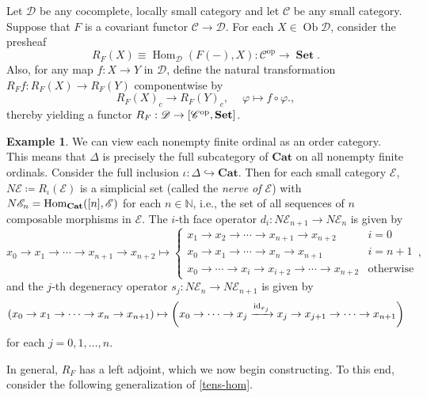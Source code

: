 \documentclass[10pt,letterpaper,cm]{nupset}
\theoremstyle{definition}
\newtheorem{exmp}[definition]{Example}
\theoremstyle{theorem}
\theoremstyle{remark}
\DeclareMathOperator{\ob}{Ob}
\newcommand{\0}{\mathbf{0}}
\newcommand{\1}{\mathbf{1}}
\newcommand{\2}{\mathbf{2}}
\DeclareMathOperator{\op}{op}
\DeclareMathOperator{\set}{\mathbf{Set}}
\renewcommand{\c}{\mathscr{C}}
\renewcommand{\d}{\mathscr{D}}
\newcommand{\e}{\mathscr{E}}
\newcommand{\N}{\mathbb N}
\DeclareMathOperator{\Hom}{Hom}
\DeclareMathOperator{\idd}{id}
\begin{document}
Let $\d$ be any cocomplete, locally small category and let $\c$ be any small category. Suppose that $F$ is a covariant functor $ \c \to \d$. For each $X \in \ob{\d}$, consider the presheaf $$R_F(X)\equiv \Hom_{\d}(F({-}), X) : \c^{\op} \to \set.$$ Also, for any map $f : X\to Y$ in $\d$, define the natural transformation $R_F{f} : R_F(X)  \to R_F(Y)$ componentwise by
\[
R_F(X)_c \to R_F(Y)_c,\ \quad \varphi \mapsto f \circ \varphi.
,\] thereby yielding a functor $R_F: \d \to \mleft[\c^{\op}, \set\mright]$. 

\begin{exmp}\label{nerve}
We can view each nonempty finite ordinal  as an order category. This means that $\varDelta$ is precisely the full subcategory of $\mathbf{Cat}$ on all nonempty finite ordinals. Consider the full inclusion $\iota : \varDelta \hookrightarrow \mathbf{Cat}$. Then for each small category $\e$, $N{\e} \coloneqq R_{\iota}(\e)$ is a simplicial set (called the \textit{nerve of $\e$}) with $N{\e}_n = \Hom_{\mathbf{Cat}}(\mleft[n\mright], \e)$ for each $n\in \N$, i.e.,  the set of all sequences of $n$ composable morphisms in $\e$.
The $i$-th face operator $d_i : N{\e}_{n+1}\to N{\e}_n$ is given by
\[
{x_0 \to x_1 \to \cdots \to x_{n+1} \to x_{n+2}} \mapsto \begin{cases}
{x_1 \to x_2\to \cdots \to x_{n+1} \to x_{n+2}} & i=0
\\ {x_0 \to x_1 \to \cdots \to x_n\to x_{n+1}} & i= n+1
\\ {x_0  \to \cdots \to x_i \to x_{i+2} \to \cdots  \to x_{n+2}} & \text{otherwise}
\end{cases}
,\] 
and the $j$-th degeneracy operator $s_j : N{\e}_n \to N{\e}_{n+1}$ is given by
\[
\mleft( x_0 \to x_1 \to \cdots \to x_{n} \to x_{n+1}\mright) \mapsto  \mleft({x_0 \to \cdots \to x_j \xrightarrow{\idd_{x_j}} x_j \to x_{j+1} \to \cdots \to x_{n+1}}\mright)  
\] for each $j=0,1, \ldots, n$.
\end{exmp}

In general, $R_F$ has a left adjoint, which we now begin constructing. To this end, consider the following generalization of \cref{tens-hom}. 

\begin{comment}
For each $x\in \ob{\d}$ and $n\in \N$, let $$R{x_n}= \Hom_{\d}(F[n], x).$$ Define the face operator $d_i : R{x_{n+1}} \to R{x_n}$ and the degeneracy operator $s_i : R{x_n} \to R{x_{n+1}}$ as the set maps $\Hom_{\d}(F(\delta_i^n), x)$ and $\Hom_{\d}(F(\sigma_i^n), x)$, respectively. By functoriality of $F$, the $F(\delta_i^n)$ and $F(\sigma_i^n)$ satisfy the cosimplicial identities. Since $\Hom_{\d}(F(-), x)$ is a contravariant functor $ \varDelta \to \set$, it follows that the $d_i$ and $s_i$ satisfy the simplicial identities, thereby making $\mleft(R{x_n}\mright)$ into a simplicial set.
\end{comment}
\end{document}
